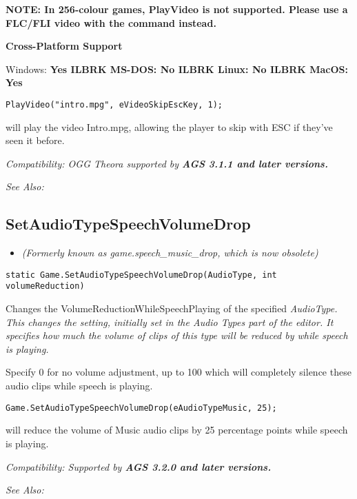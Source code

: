 \bf{NOTE:} In 256-colour games, PlayVideo is not supported. Please use a FLC/FLI video
with the  command instead.

\bf{Cross-Platform Support}

Windows: \bf{ Yes }ILBRK
MS-DOS: \bf{ No }ILBRK
Linux: \bf{ No }ILBRK
MacOS: \bf{ Yes }

\begin{verbatim}
PlayVideo("intro.mpg", eVideoSkipEscKey, 1);
\end{verbatim}
will play the video Intro.mpg, allowing the player to skip with ESC if they've seen it
before.

\it{Compatibility:} OGG Theora supported by \bf{AGS 3.1.1} and later versions.

\it{See Also:} 


\subsection{SetAudioTypeSpeechVolumeDrop}\label{Game.SetAudioTypeSpeechVolumeDrop}%

\begin{itemize}
\item \it{(Formerly known as game.speech_music_drop, which is now obsolete)}
\end{itemize}

\begin{verbatim}
static Game.SetAudioTypeSpeechVolumeDrop(AudioType, int volumeReduction)
\end{verbatim}
Changes the VolumeReductionWhileSpeechPlaying of the specified \it{AudioType}. This changes
the setting, initially set in the Audio Types part of the editor. It specifies how much
the volume of clips of this type will be reduced by while speech is playing.

Specify 0 for no volume adjustment, up to 100 which will completely silence these audio
clips while speech is playing.

\begin{verbatim}
Game.SetAudioTypeSpeechVolumeDrop(eAudioTypeMusic, 25);
\end{verbatim}
will reduce the volume of Music audio clips by 25 percentage points while speech is playing.

\it{Compatibility:} Supported by \bf{AGS 3.2.0} and later versions.

\it{See Also:} 


